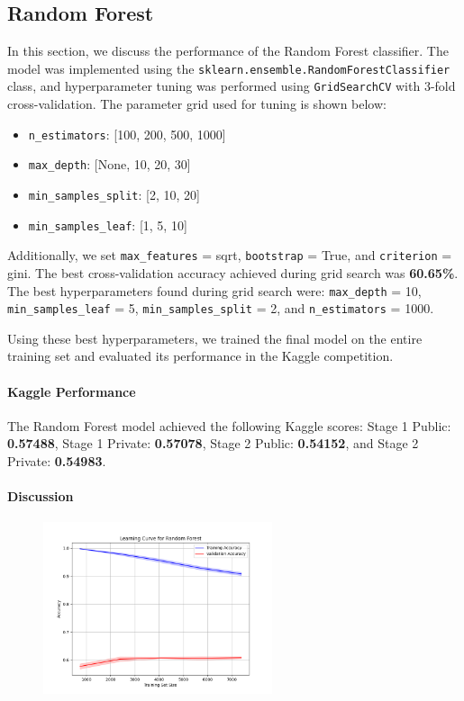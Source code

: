 \documentclass[12pt,a4paper]{article}
\begin{document}
\subsection{Random Forest}

In this section, we discuss the performance of the Random Forest classifier. The model was implemented using the \texttt{sklearn.ensemble.RandomForestClassifier} class, and hyperparameter tuning was performed using \texttt{GridSearchCV} with 3-fold cross-validation. The parameter grid used for tuning is shown below:

\begin{itemize}
    \item \texttt{n\_estimators}: [100, 200, 500, 1000]
    \item \texttt{max\_depth}: [None, 10, 20, 30]
    \item \texttt{min\_samples\_split}: [2, 10, 20]
    \item \texttt{min\_samples\_leaf}: [1, 5, 10]
\end{itemize}

Additionally, we set \texttt{max\_features} = sqrt, \texttt{bootstrap} = True, and \texttt{criterion} = gini. The best cross-validation accuracy achieved during grid search was \textbf{60.65\%}. The best hyperparameters found during grid search were: \texttt{max\_depth} = 10, \texttt{min\_samples\_leaf} = 5, \texttt{min\_samples\_split} = 2, and \texttt{n\_estimators} = 1000.

Using these best hyperparameters, we trained the final model on the entire training set and evaluated its performance in the Kaggle competition.

\paragraph{Kaggle Performance}

The Random Forest model achieved the following Kaggle scores: Stage 1 Public: \textbf{0.57488}, Stage 1 Private: \textbf{0.57078}, Stage 2 Public: \textbf{0.54152}, and Stage 2 Private: \textbf{0.54983}.

\paragraph{Discussion}

\begin{figure}[ht]
  \centering
  \includegraphics[width=0.6\textwidth]{images/learning_curve_random_forest.png}
\end{figure}
\end{document}
